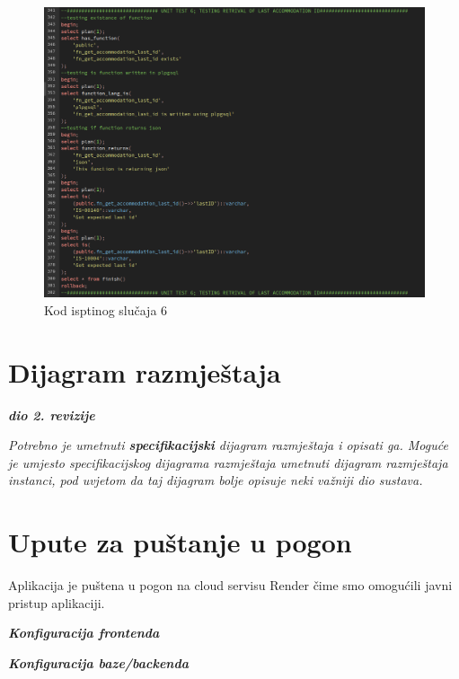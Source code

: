 				\begin{figure}[H]
					\centering
					\includegraphics[width=\textwidth]{slike/unit_tests/ut_6/code.png}
					\caption{Kod isptinog slučaja 6}
					\label{fig: IS6-kod}
				\end{figure}
				\eject
			\eject
		\section{Dijagram razmještaja}
			
			\textbf{\textit{dio 2. revizije}}
			
			 \textit{Potrebno je umetnuti \textbf{specifikacijski} dijagram razmještaja i opisati ga. Moguće je umjesto specifikacijskog dijagrama razmještaja umetnuti dijagram razmještaja instanci, pod uvjetom da taj dijagram bolje opisuje neki važniji dio sustava.}
			
			\eject 
		
		\section{Upute za puštanje u pogon}
		
			Aplikacija je puštena u pogon na cloud servisu Render čime smo omogućili javni pristup aplikaciji.
			
			\textbf{\textit{Konfiguracija frontenda}}
			
			\textbf{\textit{Konfiguracija baze/backenda}}
			
			
			\eject 